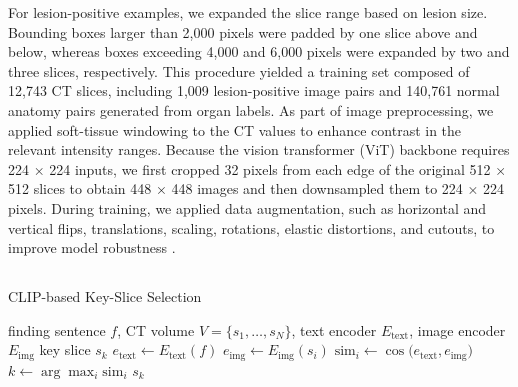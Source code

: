 \documentclass[bioengineering,article,submit,pdftex,moreauthors]{Definitions/mdpi}
\begin{document}
For lesion-positive examples, we expanded the slice range based on lesion size. Bounding boxes larger than 2,000 pixels were padded by one slice above and below, whereas boxes exceeding 4,000 and 6,000 pixels were expanded by two and three slices, respectively. 
This procedure yielded a training set composed of 12,743 CT slices, including 1,009 lesion-positive image pairs and 140,761 normal anatomy pairs generated from organ labels.
As part of image preprocessing, we applied soft-tissue windowing to the CT values to enhance contrast in the relevant intensity ranges. 
Because the vision transformer (ViT) backbone requires 224 × 224 inputs, we first cropped 32 pixels from each edge of the original 512 × 512 slices to obtain 448 × 448 images and then downsampled them to 224 × 224 pixels. 
During training, we applied data augmentation, such as horizontal and vertical flips, translations, scaling, rotations, elastic distortions, and cutouts, to improve model robustness \cite{devries_improved_2017}.


\subsection{}  


\begin{algorithm}
  \caption{CLIP-based Key-Slice Selection}
  \label{alg:key_slice_selection}
  \begin{algorithmic}[1]
    \REQUIRE finding sentence $f$, CT volume $V = \{s_1, \dots, s_N\}$, text encoder $E_{\mathrm{text}}$, image encoder $E_{\mathrm{img}}$
    \ENSURE key slice $s_k$
    \STATE $e_{\mathrm{text}} \leftarrow E_{\mathrm{text}}(f)$ 
      \STATE $e_{\mathrm{img}} \leftarrow E_{\mathrm{img}}(s_i)$ 
      \STATE $\mathrm{sim}_i \leftarrow \cos\bigl(e_{\mathrm{text}}, e_{\mathrm{img}}\bigr)$ 
    \ENDFOR
    \STATE $k \leftarrow \arg\max_i \mathrm{sim}_i$ 
    \RETURN $s_k$
  \end{algorithmic}
\end{algorithm}
\end{document}
